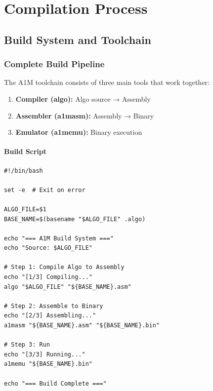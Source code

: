 \documentclass[12pt,a4paper,oneside]{book}
\begin{document}
\part{Compilation Process}

\chapter{Build System and Toolchain}

\section{Complete Build Pipeline}

The A1M toolchain consists of three main tools that work together:

\begin{enumerate}
    \item \textbf{Compiler (algo):} Algo source → Assembly
    \item \textbf{Assembler (a1masm):} Assembly → Binary
    \item \textbf{Emulator (a1memu):} Binary execution
\end{enumerate}

\subsection{Build Script}

\begin{lstlisting}[style=c, caption={build.sh - Complete Build Script}]
#!/bin/bash

set -e  # Exit on error

ALGO_FILE=$1
BASE_NAME=$(basename "$ALGO_FILE" .algo)

echo "=== A1M Build System ==="
echo "Source: $ALGO_FILE"

# Step 1: Compile Algo to Assembly
echo "[1/3] Compiling..."
algo "$ALGO_FILE" "${BASE_NAME}.asm"

# Step 2: Assemble to Binary
echo "[2/3] Assembling..."
a1masm "${BASE_NAME}.asm" "${BASE_NAME}.bin"

# Step 3: Run
echo "[3/3] Running..."
a1memu "${BASE_NAME}.bin"

echo "=== Build Complete ==="
\end{lstlisting}
\end{document}
